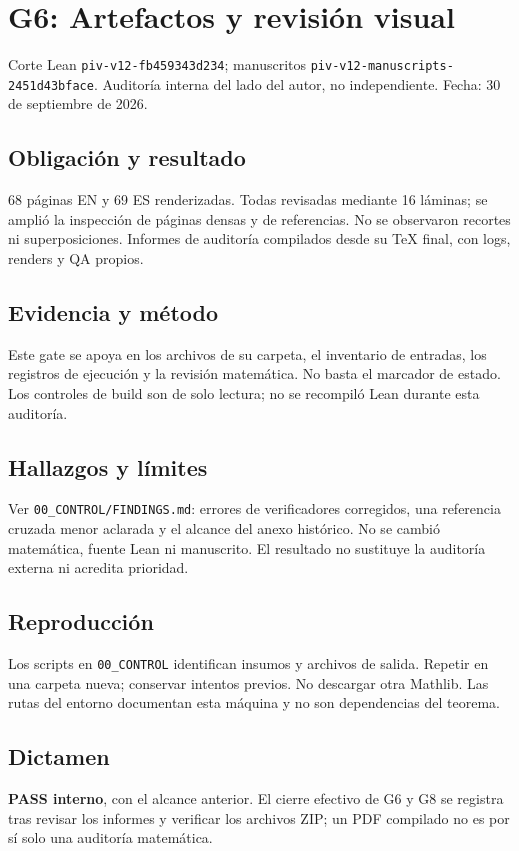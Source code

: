 \documentclass[11pt]{article}
\begin{document}
\section{G6: Artefactos y revisión
visual}\label{g6-artefactos-y-revisiuxf3n-visual}

Corte Lean \nolinkurl{piv-v12-fb459343d234}; manuscritos
\nolinkurl{piv-v12-manuscripts-2451d43bface}. Auditoría interna del lado
del autor, no independiente. Fecha: 30 de septiembre de 2026.

\subsection{Obligación y resultado}\label{obligaciuxf3n-y-resultado}

68 páginas EN y 69 ES renderizadas. Todas revisadas mediante 16 láminas;
se amplió la inspección de páginas densas y de referencias. No se
observaron recortes ni superposiciones. Informes de auditoría compilados
desde su TeX final, con logs, renders y QA propios.

\subsection{Evidencia y método}\label{evidencia-y-muxe9todo}

Este gate se apoya en los archivos de su carpeta, el inventario de
entradas, los registros de ejecución y la revisión matemática. No basta
el marcador de estado. Los controles de build son de solo lectura; no se
recompiló Lean durante esta auditoría.

\subsection{Hallazgos y límites}\label{hallazgos-y-luxedmites}

Ver \nolinkurl{00_CONTROL/FINDINGS.md}: errores de verificadores
corregidos, una referencia cruzada menor aclarada y el alcance del anexo
histórico. No se cambió matemática, fuente Lean ni manuscrito. El
resultado no sustituye la auditoría externa ni acredita prioridad.

\subsection{Reproducción}\label{reproducciuxf3n}

Los scripts en \nolinkurl{00_CONTROL} identifican insumos y archivos de
salida. Repetir en una carpeta nueva; conservar intentos previos. No
descargar otra Mathlib. Las rutas del entorno documentan esta máquina y
no son dependencias del teorema.

\subsection{Dictamen}\label{dictamen}

\textbf{PASS interno}, con el alcance anterior. El cierre efectivo de G6
y G8 se registra tras revisar los informes y verificar los archivos ZIP;
un PDF compilado no es por sí solo una auditoría matemática.
\end{document}
